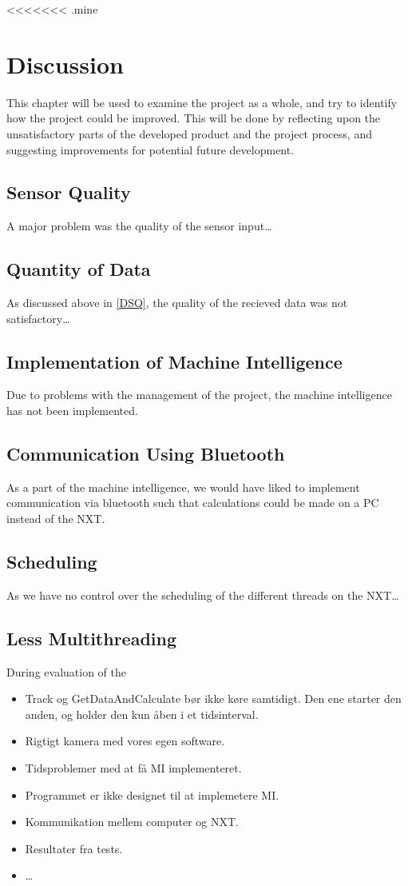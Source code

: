 <<<<<<< .mine
\chapter{Discussion}\label{projDiscus}
This chapter will be used to examine the project as a whole, and try to identify
how the project could be improved. This will be done by reflecting upon the
unsatisfactory parts of the developed product and the project process, and
suggesting improvements for potential future development.

\section{Sensor Quality}\label{DSQ}
A major problem was the quality of the sensor input\ldots

\section{Quantity of Data}
As discussed above in \autoref{DSQ}, the quality of the recieved data was not
satisfactory\ldots

\section{Implementation of Machine Intelligence}
Due to problems with the management of the project, the machine intelligence has
not been implemented.

\section{Communication Using Bluetooth}
As a part of the machine intelligence, we would have liked to implement
communication via bluetooth such that calculations could be made on a PC instead
of the NXT.

\section{Scheduling}
As we have no control over the scheduling of the different threads on the NXT\ldots

\section{Less Multithreading}
During evaluation of the 

\begin{itemize}
  \item Track og GetDataAndCalculate bør ikke køre samtidigt. Den ene starter
  den anden, og holder den kun åben i et tidsinterval.
  \item Rigtigt kamera med vores egen software.
  \item Tidsproblemer med at få MI implementeret.
  \item Programmet er ikke designet til at implemetere MI.
  \item Kommunikation mellem computer og NXT.
  \item Resultater fra tests.
  \item \ldots
\end{itemize}
